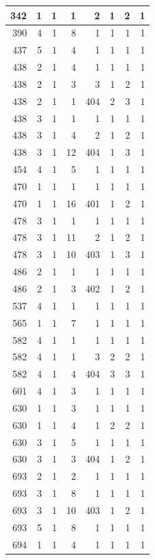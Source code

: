 \documentclass[11pt,]{book}
\begin{document}
\begin{table}
\begin{tabular}[t]{r|r|r|r|r|r|r|r}
\hline
342 & 1 & 1 & 1 & 2 & 1 & 2 & 1\\
\hline
390 & 4 & 1 & 8 & 1 & 1 & 1 & 1\\
\hline
437 & 5 & 1 & 4 & 1 & 1 & 1 & 1\\
\hline
438 & 2 & 1 & 4 & 1 & 1 & 1 & 1\\
\hline
438 & 2 & 1 & 3 & 3 & 1 & 2 & 1\\
\hline
438 & 2 & 1 & 1 & 404 & 2 & 3 & 1\\
\hline
438 & 3 & 1 & 1 & 1 & 1 & 1 & 1\\
\hline
438 & 3 & 1 & 4 & 2 & 1 & 2 & 1\\
\hline
438 & 3 & 1 & 12 & 404 & 1 & 3 & 1\\
\hline
454 & 4 & 1 & 5 & 1 & 1 & 1 & 1\\
\hline
470 & 1 & 1 & 1 & 1 & 1 & 1 & 1\\
\hline
470 & 1 & 1 & 16 & 401 & 1 & 2 & 1\\
\hline
478 & 3 & 1 & 1 & 1 & 1 & 1 & 1\\
\hline
478 & 3 & 1 & 11 & 2 & 1 & 2 & 1\\
\hline
478 & 3 & 1 & 10 & 403 & 1 & 3 & 1\\
\hline
486 & 2 & 1 & 1 & 1 & 1 & 1 & 1\\
\hline
486 & 2 & 1 & 3 & 402 & 1 & 2 & 1\\
\hline
537 & 4 & 1 & 1 & 1 & 1 & 1 & 1\\
\hline
565 & 1 & 1 & 7 & 1 & 1 & 1 & 1\\
\hline
582 & 4 & 1 & 1 & 1 & 1 & 1 & 1\\
\hline
582 & 4 & 1 & 1 & 3 & 2 & 2 & 1\\
\hline
582 & 4 & 1 & 4 & 404 & 3 & 3 & 1\\
\hline
601 & 4 & 1 & 3 & 1 & 1 & 1 & 1\\
\hline
630 & 1 & 1 & 3 & 1 & 1 & 1 & 1\\
\hline
630 & 1 & 1 & 4 & 1 & 2 & 2 & 1\\
\hline
630 & 3 & 1 & 5 & 1 & 1 & 1 & 1\\
\hline
630 & 3 & 1 & 3 & 404 & 1 & 2 & 1\\
\hline
693 & 2 & 1 & 2 & 1 & 1 & 1 & 1\\
\hline
693 & 3 & 1 & 8 & 1 & 1 & 1 & 1\\
\hline
693 & 3 & 1 & 10 & 403 & 1 & 2 & 1\\
\hline
693 & 5 & 1 & 8 & 1 & 1 & 1 & 1\\
\hline
694 & 1 & 1 & 4 & 1 & 1 & 1 & 1\\

\end{tabular}
\end{table}
\end{document}
